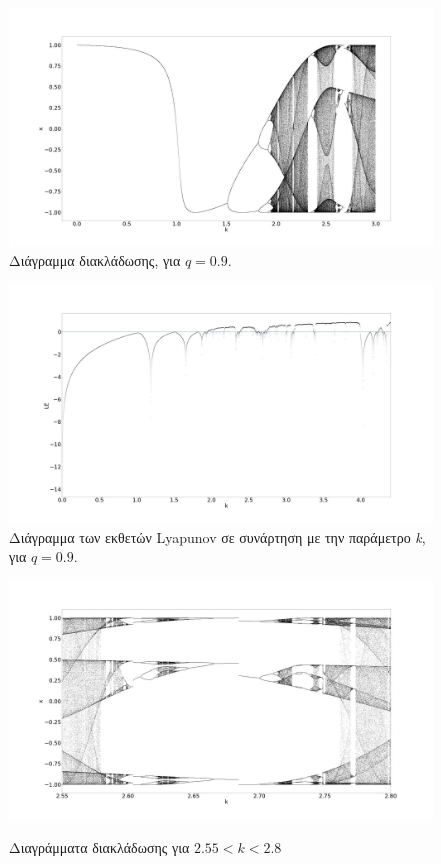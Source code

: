 \begin{table}[ht]
\begin{tabular}{l | l}
	\end{tabular}
	
\end{table}


\begin{figure}[ht]
	\centering
	\includegraphics[width=1\linewidth]{LateX images/cheb q=0.9/g1}
	\caption{Διάγραμμα διακλάδωσης, για $q=0.9$.}
	\label{f:g65}
\end{figure}


\begin{figure}[ht]
	\centering
	\includegraphics[width=1\linewidth]{LateX images/cheb q=0.9/g2}
	\caption{Διάγραμμα των εκθετών Lyapunov σε συνάρτηση με την παράμετρο \emph{k}, για $q=0.9$.}
	\label{f:g66}
\end{figure}


\begin{figure}[ht]
	\centering
	\includegraphics[width=\textwidth]{LateX images/cheb q=0.9/g3}
	\label{f:g67}
	\caption{Διαγράμματα διακλάδωσης για $2.55<k<2.8$ }
\end{figure}

